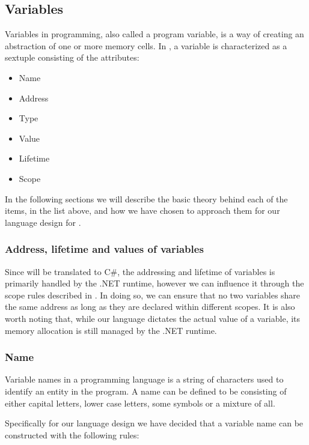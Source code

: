 \subsection{Variables}

Variables in programming, also called a program variable, is a way of creating an abstraction of one or more memory cells. 
In \cite{sebesta_concepts_2016}, a variable is characterized as a sextuple consisting of the attributes:

\begin{itemize}
    \item Name
    \item Address
    \item Type
    \item Value
    \item Lifetime
    \item Scope
\end{itemize}

In the following sections we will describe the basic theory behind each of the items, in the list above, and how we have chosen to approach them for our language design for \dazel{}.

\subsubsection*{Address, lifetime and values of variables}
Since \dazel{} will be translated to C\#, the addressing and lifetime of variables is primarily handled by the .NET runtime, 
however we can influence it through the scope rules described in .
In doing so, we can ensure that no two variables share the same address as long as they are declared within different scopes.
It is also worth noting that, while our language dictates the actual value of a variable, its memory allocation is still managed by the .NET runtime.

\subsubsection*{Name}

Variable names in a programming language is a string of characters used to identify an entity in the program\cite{sebesta_concepts_2016}. A name can be defined to be consisting of either capital letters,
lower case letters, some symbols or a mixture of all.

Specifically for our language design we have decided that a variable name can be constructed with the following rules:

